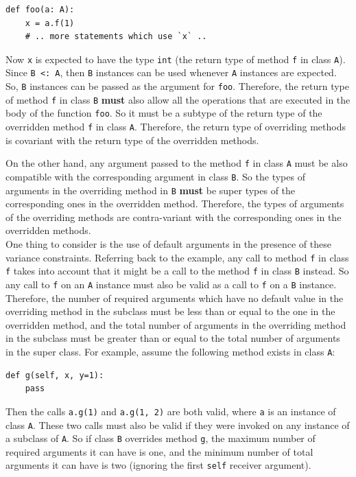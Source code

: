 \begin{lstlisting}
def foo(a: A):
	x = a.f(1)
	# .. more statements which use `x` ..
\end{lstlisting}
Now \lstinline|x| is expected to have the type \lstinline|int| (the return type of method \lstinline|f| in class \lstinline|A|). Since \lstinline|B <: A|, then \lstinline|B| instances can be used whenever \lstinline|A| instances are expected. So, \lstinline|B| instances can be passed as the argument for \lstinline|foo|. Therefore, the return type of method \lstinline|f| in class \lstinline|B| \textbf{must} also allow all the operations that are executed in the body of the function \lstinline|foo|. So it must be a subtype of the return type of the overridden method \lstinline|f| in class \lstinline|A|. Therefore, the return type of overriding methods is covariant with the return type of the overridden methods.

On the other hand, any argument passed to the method \lstinline|f| in class \lstinline|A| must be also compatible with the corresponding argument in class \lstinline|B|. So the types of arguments in the overriding method in \lstinline|B| \textbf{must} be super types of the corresponding ones in the overridden method. Therefore, the types of arguments of the overriding methods are contra-variant with the corresponding ones in the overridden methods. \\

One thing to consider is the use of default arguments in the presence of these variance constraints. Referring back to the example, any call to method \lstinline|f| in class \lstinline|f| takes into account that it might be a call to the method \lstinline|f| in class \lstinline|B| instead. So any call to \lstinline|f| on an \lstinline|A| instance must also be valid as a call to \lstinline|f| on a \lstinline|B| instance. Therefore, the number of required arguments which have no default value in the overriding method in the subclass must be less than or equal to the one in the overridden method, and the total number of arguments in the overriding method in the subclass must be greater than or equal to the total number of arguments in the super class. For example, assume the following method exists in class \lstinline|A|:
\begin{lstlisting}
def g(self, x, y=1):
	pass
\end{lstlisting}
Then the calls \lstinline|a.g(1)| and \lstinline|a.g(1, 2)| are both valid, where \lstinline|a| is an instance of class \lstinline|A|. These two calls must also be valid if they were invoked on any instance of a subclass of \lstinline|A|. So if class \lstinline|B| overrides method \lstinline|g|, the maximum number of required arguments it can have is one, and the minimum number of total arguments it can have is two (ignoring the first \lstinline|self| receiver argument).\\

